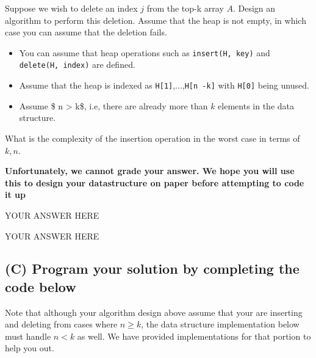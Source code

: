\documentclass[
]{article}
\providecommand{\tightlist}{%
  \setlength{\itemsep}{0pt}\setlength{\parskip}{0pt}}
\begin{document}
Suppose we wish to delete an index \(j\) from the top-k array \(A\).
Design an algorithm to perform this deletion. Assume that the heap is
not empty, in which case you can assume that the deletion fails.

\begin{itemize}
\tightlist
\item
  You can assume that heap operations such as \texttt{insert(H,\ key)}
  and \texttt{delete(H,\ index)} are defined.
\item
  Assume that the heap is indexed as
  \texttt{H{[}1{]}},...,\texttt{H{[}n\ -k{]}} with \texttt{H{[}0{]}}
  being unused.
\item
  Assume \$ n \textgreater{} k\$, i.e, there are already more than \(k\)
  elements in the data structure.
\end{itemize}

What is the complexity of the insertion operation in the worst case in
terms of \(k, n\).

\textbf{Unfortunately, we cannot grade your answer. We hope you will use
this to design your datastructure on paper before attempting to code it
up}

YOUR ANSWER HERE

YOUR ANSWER HERE

\hypertarget{c-program-your-solution-by-completing-the-code-below}{%
\subsection{(C) Program your solution by completing the code
below}\label{c-program-your-solution-by-completing-the-code-below}}

Note that although your algorithm design above assume that your are
inserting and deleting from cases where \(n \geq k\), the data structure
implementation below must handle \(n < k\) as well. We have provided
implementations for that portion to help you out.
\end{document}
